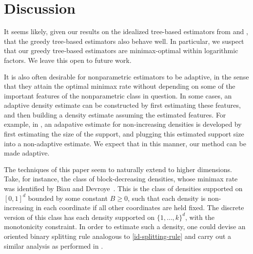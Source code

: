 \section{Discussion}

It seems likely, given our results on the idealized tree-based
estimators from  and , that the greedy
tree-based estimators also behave well. In particular, we suspect that
our greedy tree-based estimators are minimax-optimal within
logarithmic factors. We leave this open to future work.

It is also often desirable for nonparametric estimators to be
adaptive, in the sense that they attain the optimal minimax rate
without depending on some of the important features of the
nonparametric class in question. In some cases, an adaptive density
estimate can be constructed by first estimating these features, and
then building a density estimate assuming the estimated features. For
example, in \cite{birge-risk}, an adapative estimate for
non-increasing densities is developed by first estimating the size of
the support, and plugging this estimated support size into a
non-adaptive estimate. We expect that in this manner, our method can
be made adaptive.

The techniques of this paper seem to naturally extend to higher
dimensions. Take, for instance, the class of block-decreasing
densities, whose minimax rate was identified by Biau and
Devroye~\cite{block}. This is the class of densities supported on
$[0, 1]^d$ bounded by some constant $B \ge 0$, such that each density
is non-increasing in each coordinate if all other coordinates are held
fixed. The discrete version of this class has each density supported
on $\{1, \dots, k\}^d$, with the monotonicity constraint. In order to
estimate such a density, one could devise an oriented binary splitting
rule analogous to \eqref{id-splitting-rule} and carry out a similar
analysis as performed in .


